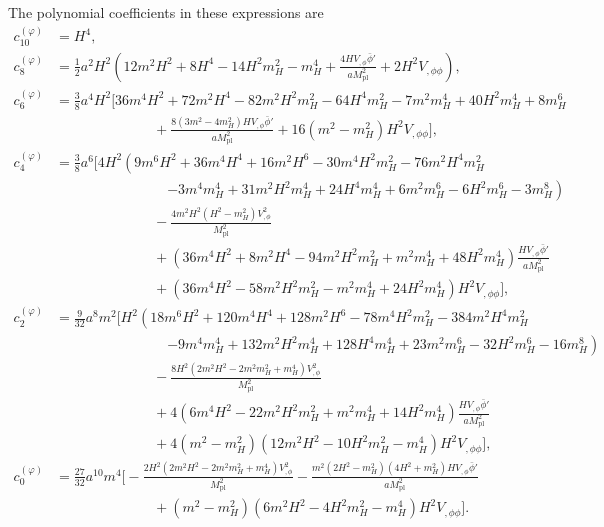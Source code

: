 \documentclass[11pt]{article}
\newcommand{\Mpl}{M_{\mathrm{pl}}}
\begin{document}
The polynomial coefficients in these expressions are
\begin{align}
c_{10}^{(\varphi)} &= H^4, \\
c_8^{(\varphi)} &=
\frac12a^2H^2\left(
12m^2H^2+8H^4-14H^2m_H^2-m_H^4
+\frac{4HV_{,\phi}\bar\phi'}{a\Mpl^2}+2H^2V_{,\phi\phi}
\right), \\
c_6^{(\varphi)} &=
\frac38a^4H^2\bigg[
36m^4H^2+72m^2H^4-82m^2H^2m_H^2-64H^4m_H^2
-7m^2m_H^4+40H^2m_H^4+8m_H^6 \nonumber\\
&\hspace{7em}
+\frac{8(3m^2-4m_H^2)HV_{,\phi}\bar\phi'}{a\Mpl^2}
+16(m^2-m_H^2)H^2V_{,\phi\phi}
\bigg], \\
c_4^{(\varphi)} &=
\frac38a^6\bigg[
4H^2\left(
9m^6H^2+36m^4H^4+16m^2H^6-30m^4H^2m_H^2-76m^2H^4m_H^2 \right. \nonumber\\
&\hspace{8em}\left.
-3m^4m_H^4+31m^2H^2m_H^4+24H^4m_H^4+6m^2m_H^6-6H^2m_H^6-3m_H^8
\right) \nonumber\\
&\hspace{7em}
-\frac{4m^2H^2(H^2-m_H^2)V_{,\phi}^2}{\Mpl^2} \nonumber\\
&\hspace{7em}
+\left(36m^4H^2+8m^2H^4-94m^2H^2m_H^2+m^2m_H^4+48H^2m_H^4\right)
\frac{HV_{,\phi}\bar\phi'}{a\Mpl^2} \nonumber\\
&\hspace{7em}
+\left(36m^4H^2-58m^2H^2m_H^2-m^2m_H^4+24H^2m_H^4\right)H^2V_{,\phi\phi}
\bigg], \\
c_2^{(\varphi)} &=
\frac{9}{32}a^8m^2\bigg[
H^2\left(
18m^6H^2+120m^4H^4+128m^2H^6-78m^4H^2m_H^2-384m^2H^4m_H^2 \right. \nonumber\\
&\hspace{8em}\left.
-9m^4m_H^4+132m^2H^2m_H^4+128H^4m_H^4+23m^2m_H^6-32H^2m_H^6-16m_H^8
\right) \nonumber\\
&\hspace{7em}
-\frac{8H^2(2m^2H^2-2m^2m_H^2+m_H^4)V_{,\phi}^2}{\Mpl^2} \nonumber\\
&\hspace{7em}
+4\left(6m^4H^2-22m^2H^2m_H^2+m^2m_H^4+14H^2m_H^4\right)
\frac{HV_{,\phi}\bar\phi'}{a\Mpl^2} \nonumber\\
&\hspace{7em}
+4(m^2-m_H^2)(12m^2H^2-10H^2m_H^2-m_H^4)H^2V_{,\phi\phi}
\bigg], \\
c_0^{(\varphi)} &=
\frac{27}{32}a^{10}m^4\bigg[
-\frac{2H^2(2m^2H^2-2m^2m_H^2+m_H^4)V_{,\phi}^2}{\Mpl^2}
-\frac{m^2(2H^2-m_H^2)(4H^2+m_H^2)HV_{,\phi}\bar\phi'}{a\Mpl^2} \nonumber\\
&\hspace{7em}
+(m^2-m_H^2)(6m^2H^2-4H^2m_H^2-m_H^4)H^2V_{,\phi\phi}
\bigg].
\end{align}
\end{document}
